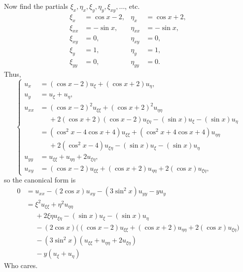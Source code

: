 \begin{solution*}
  Now find the partials \(\xi_x,\eta_x,\xi_y,\eta_y,\xi_{xy},\dotsc\), etc.
  \begin{align*}
    \xi_x&=\cos x-2,
    &\eta_x&=\cos x+2,\\
    \xi_{xx}&=-\sin x,
    &\eta_{xx}&=-\sin x,\\
    \xi_{xy}&=0,
    &\eta_{xy}&=0,\\
    \xi_y&=1,
    &\eta_y&=1,\\
    \xi_{yy}&=0,
    &\eta_{yy}&=0.
  \end{align*}
  Thus,
  \[\left\{
      \begin{aligned}
        u_x&=(\cos x-2)u_\xi+(\cos x+2)u_\eta,\\
        u_y&=u_\xi+u_\eta,\\
        u_{xx}&=(\cos x-2)^2u_{\xi\xi}+(\cos x+2)^2u_{\eta\eta}\\
        &\phantom{{}={}}+2(\cos x+2)(\cos x-2)u_{\xi\eta}-(\sin
        x)u_\xi-(\sin
        x)u_\eta\\
        &=(\cos^2 x-4\cos x+4)u_{\xi\xi}+(\cos^2 x+4\cos x+4)u_{\eta\eta}\\
        &\phantom{{}={}}+2(\cos^2 x-4)u_{\xi\eta}-(\sin x)u_\xi-(\sin x)u_\eta\\
        u_{yy}&=u_{\xi\xi}+u_{\eta\eta}+2u_{\xi\eta},\\
        u_{xy}&=(\cos x-2)u_{\xi\xi}+(\cos x+2)u_{\eta\eta}+2(\cos
        x)u_{\xi\eta},
      \end{aligned}\right.\]%
  so the canonical form is
  \begin{align*}
    0
    &=u_{xx}-(2\cos x)u_{xy}-(3\sin^2 x)u_{yy}-yu_y\\
    &=\xi^2u_{\xi\xi}+\eta^2u_{\eta\eta}\\
    &\phantom{{}={}}+2\xi\eta u_{\xi\eta}-(\sin x)u_\xi-(\sin
      x)u_\eta\\
    &\phantom{{}={}}-(2\cos x)\bigl((\cos x-2)u_{\xi\xi}+(\cos x+2)u_{\eta\eta}+2(\cos
      x)u_{\xi\eta}\bigr)\\
    &\phantom{{}={}}-(3\sin^2 x)(u_{\xi\xi}+u_{\eta\eta}+2u_{\xi\eta})\\
    &\phantom{{}={}}-y(u_\xi+u_\eta)
  \end{align*}
  Who cares.
\end{solution*}

